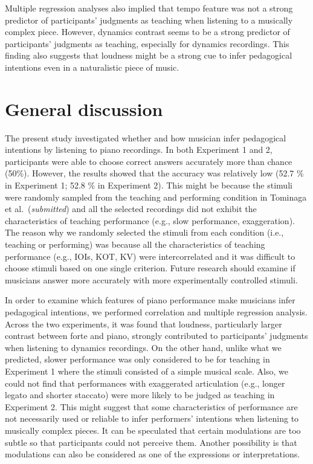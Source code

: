 \documentclass[
  man,floatsintext]{apa6}
\begin{document}
Multiple regression analyses also implied that tempo feature was not a strong predictor of participants' judgments as teaching when listening to a musically complex piece. However, dynamics contrast seems to be a strong predictor of participants' judgments as teaching, especially for dynamics recordings. This finding also suggests that loudness might be a strong cue to infer pedagogical intentions even in a naturalistic piece of music.

\hypertarget{general-discussion}{%
\section{General discussion}\label{general-discussion}}

The present study investigated whether and how musician infer pedagogical intentions by listening to piano recordings. In both Experiment 1 and 2, participants were able to choose correct answers accurately more than chance (50\%). However, the results showed that the accuracy was relatively low (52.7 \% in Experiment 1; 52.8 \% in Experiment 2). This might be because the stimuli were randomly sampled from the teaching and performing condition in Tominaga et al.~(\emph{submitted}) and all the selected recordings did not exhibit the characteristics of teaching performance (e.g., slow performance, exaggeration). The reason why we randomly selected the stimuli from each condition (i.e., teaching or performing) was because all the characteristics of teaching performance (e.g., IOIs, KOT, KV) were intercorrelated and it was difficult to choose stimuli based on one single criterion. Future research should examine if musicians answer more accurately with more experimentally controlled stimuli.

In order to examine which features of piano performance make musicians infer pedagogical intentions, we performed correlation and multiple regression analysis. Across the two experiments, it was found that loudness, particularly larger contrast between forte and piano, strongly contributed to participants' judgments when listening to dynamics recordings. On the other hand, unlike what we predicted, slower performance was only considered to be for teaching in Experiment 1 where the stimuli consisted of a simple musical scale. Also, we could not find that performances with exaggerated articulation (e.g., longer legato and shorter staccato) were more likely to be judged as teaching in Experiment 2. This might suggest that some characteristics of performance are not necessarily used or reliable to infer performers' intentions when listening to musically complex pieces. It can be speculated that certain modulations are too subtle so that participants could not perceive them. Another possibility is that modulations can also be considered as one of the expressions or interpretations.
\end{document}
